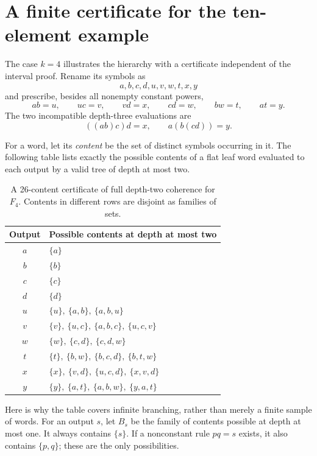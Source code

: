\documentclass[11pt,letterpaper]{article}
\numberwithin{equation}{section}
\theoremstyle{definition}
\theoremstyle{remark}
\newcommand{\set}[1]{\{#1\}}
\begin{document}
\section{A finite certificate for the ten-element example}
\label{sec:certificate}
The case $k=4$ illustrates the hierarchy with a certificate independent of the interval proof. Rename its symbols as
\[
a,b,c,d,u,v,w,t,x,y
\]
and prescribe, besides all nonempty constant powers,
\begin{equation}\label{eq:F4-products}
ab=u,\qquad uc=v,\qquad vd=x,
\qquad cd=w,\qquad bw=t,\qquad at=y.
\end{equation}
The two incompatible depth-three evaluations are
\[
((ab)c)d=x,\qquad a(b(cd))=y.
\]

For a word, let its \emph{content} be the set of distinct symbols occurring in it. The following table lists exactly the possible contents of a flat leaf word evaluated to each output by a valid tree of depth at most two.

\begin{table}[htbp]
\centering
\renewcommand{\arraystretch}{1.18}
\begin{tabular}{@{}cl@{}}
\toprule
Output & Possible contents at depth at most two\\
\midrule
$a$ & $\set{a}$\\
$b$ & $\set{b}$\\
$c$ & $\set{c}$\\
$d$ & $\set{d}$\\
$u$ & $\set{u},\ \set{a,b},\ \set{a,b,u}$\\
$v$ & $\set{v},\ \set{u,c},\ \set{a,b,c},\ \set{u,c,v}$\\
$w$ & $\set{w},\ \set{c,d},\ \set{c,d,w}$\\
$t$ & $\set{t},\ \set{b,w},\ \set{b,c,d},\ \set{b,t,w}$\\
$x$ & $\set{x},\ \set{v,d},\ \set{u,c,d},\ \set{x,v,d}$\\
$y$ & $\set{y},\ \set{a,t},\ \set{a,b,w},\ \set{y,a,t}$\\
\bottomrule
\end{tabular}
\caption{A 26-content certificate of full depth-two coherence for $F_4$. Contents in different rows are disjoint as families of sets.}
\label{tab:contents}
\end{table}

Here is why the table covers infinite branching, rather than merely a finite sample of words. For an output $s$, let $B_s$ be the family of contents possible at depth at most one. It always contains $\set{s}$. If a nonconstant rule $pq=s$ exists, it also contains $\set{p,q}$; these are the only possibilities.
\end{document}
